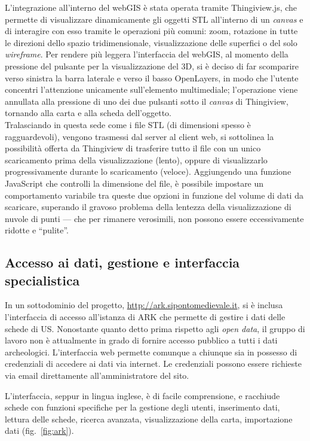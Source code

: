 \documentclass{paper}
\let\footnote\footnoteA
\begin{document}
        L'integrazione all'interno del webGIS è stata operata tramite Thingiview.js\footnote{\url{https://github.com/tbuser/thingiview.js}.}, che permette di visualizzare dinamicamente gli oggetti STL all'interno di un \textit{canvas} e di interagire con esso tramite le operazioni più comuni: zoom, rotazione in tutte le direzioni dello spazio tridimensionale, visualizzazione delle superfici o del solo \textit{wireframe}. Per rendere più leggera l'interfaccia del webGIS, al momento della pressione del pulsante per la visualizzazione del 3D, si è deciso di far scomparire verso sinistra la barra laterale e verso il basso OpenLayers, in modo che l'utente concentri l'attenzione unicamente sull'elemento multimediale; l'operazione viene annullata alla pressione di uno dei due pulsanti sotto il \textit{canvas} di Thingiview, tornando alla carta e alla scheda dell'oggetto.\\
    
        Tralasciando in questa sede come i file STL (di dimensioni spesso è ragguardevoli), vengono trasmessi dal server al client web, si sottolinea la possibilità offerta da Thingiview di trasferire tutto il file con un unico scaricamento prima della visualizzazione (lento), oppure di visualizzarlo progressivamente durante lo scaricamento (veloce). Aggiungendo una funzione JavaScript che controlli la dimensione del file, è possibile impostare un comportamento variabile tra queste due opzioni in funzione del volume di dati da scaricare, superando il gravoso problema della lentezza della visualizzazione di nuvole di punti --- che per rimanere verosimili, non possono essere eccessivamente ridotte e ``pulite''.

    \subsection{Accesso ai dati, gestione e interfaccia specialistica}

        In un sottodominio del progetto, \url{http://ark.sipontomedievale.it}, si è inclusa l'interfaccia di accesso all'istanza di ARK che permette di gestire i dati delle schede di US. Nonostante quanto detto prima rispetto agli \textit{open data}, il gruppo di lavoro non è attualmente in grado di fornire accesso pubblico a tutti i dati archeologici. L'interfaccia web permette comunque a chiunque sia in possesso di credenziali di accedere ai dati via internet. Le credenziali possono essere richieste via email direttamente all'amministratore del sito.

        L'interfaccia, seppur in lingua inglese, è di facile comprensione, e racchiude schede con funzioni specifiche per la gestione degli utenti, inserimento dati, lettura delle schede, ricerca avanzata, visualizzazione della carta, importazione dati (fig.~\ref{fig:ark}).
\end{document}
